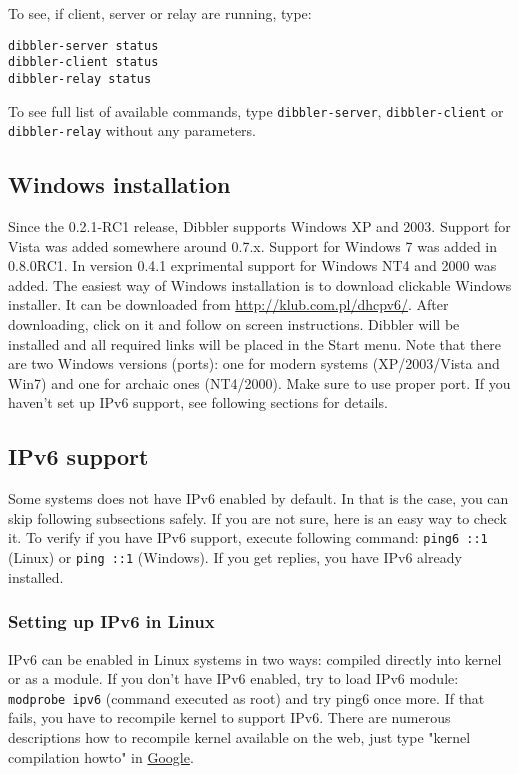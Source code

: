 To see, if client, server or relay are running, type:

\begin{verbatim}
dibbler-server status
dibbler-client status
dibbler-relay status
\end{verbatim}

To see full list of available commands, type \verb+dibbler-server+, 
\verb+dibbler-client+ or \verb+dibbler-relay+ without any parameters.

\subsection{Windows installation}
Since the 0.2.1-RC1 release, Dibbler supports Windows XP and 2003. 
Support for Vista was added somewhere around 0.7.x. Support for
Windows 7 was added in 0.8.0RC1. In version 0.4.1 exprimental support for Windows NT4 and 2000 was added. The easiest
way of Windows installation is to download clickable Windows installer. It can be downloaded from
\url{http://klub.com.pl/dhcpv6/}. After downloading, click on it and
follow on screen instructions. Dibbler will be installed and all
required links will be placed in the Start menu. Note that there are
two Windows versions (ports): one for modern systems (XP/2003/Vista
and Win7) and one for archaic ones (NT4/2000). Make sure
to use proper port. If you haven't set up IPv6 support, see following
sections for details.

\subsection{IPv6 support}
Some systems does not have IPv6 enabled by default. In that is the case,
you can skip following subsections safely. If you are not sure, here is
an easy way to check it. To verify if you have IPv6 support, execute
following command: \verb+ping6 ::1+ (Linux) or \verb+ping ::1+
(Windows). If you get replies, you have IPv6 already installed.

\subsubsection{Setting up IPv6 in Linux}
IPv6 can be enabled in Linux systems in two ways: compiled directly
into kernel or as a module. If you don't have IPv6 enabled, try to load IPv6 module:
\verb+modprobe ipv6+ (command executed as root) and try ping6 once more. If that
fails, you have to recompile kernel to support IPv6. There are 
numerous descriptions how to recompile kernel available on the web, just
type "kernel compilation howto" in \href{http://www.google.com}{Google}.

